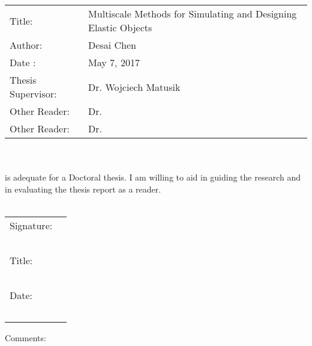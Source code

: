\documentclass[11pt]{article}
\begin{document}
\begin{tabular}{p{4cm} l}
	Title: & Multiscale Methods for Simulating and Designing Elastic Objects\\
	Author: & Desai Chen\\
	Date : & May 7, 2017 \\
	Thesis Supervisor: & Dr. Wojciech Matusik\\
	Other Reader: & Dr.\\
	Other Reader: & Dr.
\end{tabular}\\~\\
is adequate for a Doctoral thesis. I am willing to aid in guiding the research and in
evaluating the thesis report as a reader.\\~\\
\begin{flushright}
	\begin{tabular}{l l}
		Signature: & \underline{\hspace{6cm}}\\~\\
		Title: & \underline{\hspace{6cm}}\\~\\
		Date: & \underline{\hspace{6cm}}\\~\\
	\end{tabular}
\end{flushright}
Comments:
\newpage
{}

\end{document}
